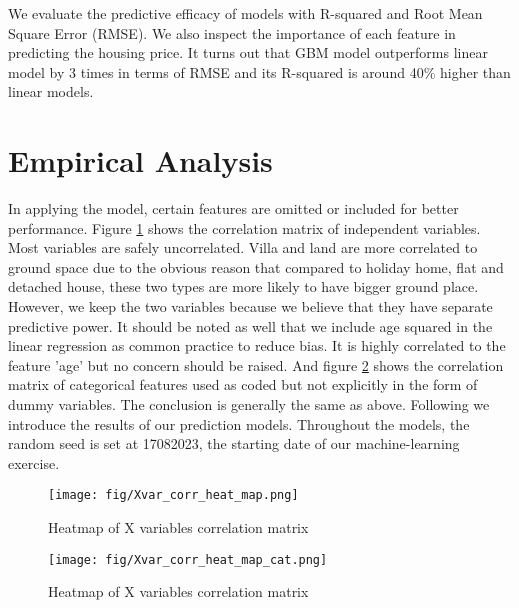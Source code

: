 \documentclass[12pt]{article} %
\begin{document}
{        We evaluate the predictive efficacy of models with R-squared and Root Mean Square Error (RMSE). We also inspect the importance of each feature in predicting the housing price. It turns out that GBM model outperforms linear model by 3 times in terms of RMSE and its R-squared is around 40\% higher than linear models.\par
		
\section{Empirical Analysis}
        In applying the model, certain features are omitted or included for better performance. Figure \ref{fig:heatmap} shows the correlation matrix of independent variables. Most variables are safely uncorrelated. Villa and land are more correlated to ground space due to the obvious reason that compared to holiday home, flat and detached house, these two types are more likely to have bigger ground place. However, we keep the two variables because we believe that they have separate predictive power. It should be noted as well that we include age squared in the linear regression as common practice to reduce bias. It is highly correlated to the feature 'age' but no concern should be raised. And figure \ref{fig:heatmapcat} shows the correlation matrix of categorical features used as coded but not explicitly in the form of dummy variables. The conclusion is generally the same as above. Following we introduce the results of our prediction models. Throughout the models, the random seed is set at 17082023, the starting date of our machine-learning exercise.
        
        \begin{figure}[]
            \centering
            \texttt{[image: fig/Xvar\_corr\_heat\_map.png]}
            \caption{Heatmap of X variables correlation matrix}
            \label{fig:heatmap}
        \end{figure}

        \begin{figure}[]
            \centering
            \texttt{[image: fig/Xvar\_corr\_heat\_map\_cat.png]}
            \caption{Heatmap of X variables correlation matrix}
            \label{fig:heatmapcat}
        \end{figure}

}
\end{document}
